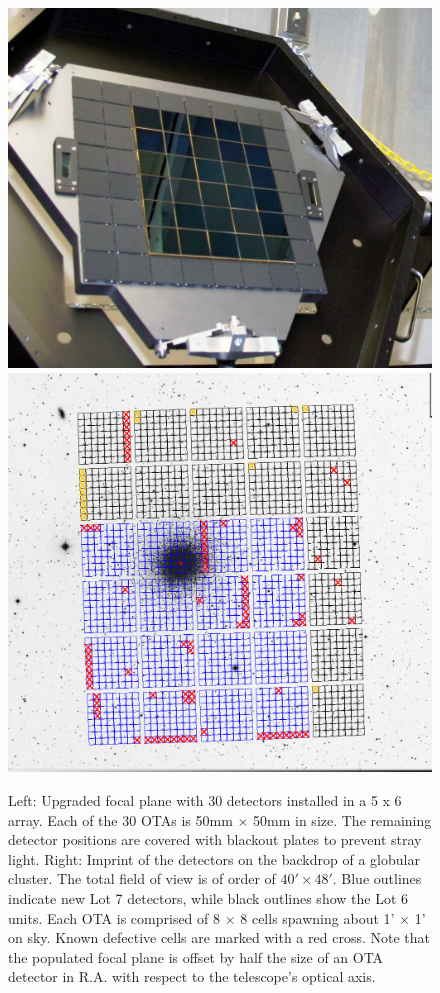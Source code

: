 \documentclass[]{spieman}
\begin{document}
\begin{figure}
	\centering
	\hfill
	\includegraphics[height=0.4\textwidth]{images/detectorsOnFocalPlane5x6.jpg}
	\hfill
	\includegraphics[height=0.4\textwidth]{images/5ODI_Imprint.png}
	\hfill \\[1ex]
	
	\caption{\label{fig_focalplane} Left: Upgraded focal plane with 30 
	detectors installed in a 5 x 6 array. Each of the 30 OTAs is 50mm 
	$\times$ 50mm in size. The remaining detector positions are 
	covered with blackout plates to prevent stray light. Right: Imprint of the 
	detectors on the backdrop of a globular cluster. The total field of view is
	of order of $40' \times 48'$.  Blue outlines indicate new Lot 7 detectors,
	while black outlines show the Lot 6 units. Each OTA is comprised of 8  $\times$ 8 cells
	spawning about 1' $\times$ 1' on sky. Known defective cells are marked with a
	red cross. Note that the populated focal plane is offset by half the size of an OTA detector 
	in R.A. with respect to the telescope's optical axis. }
\end{figure}
\end{document}
